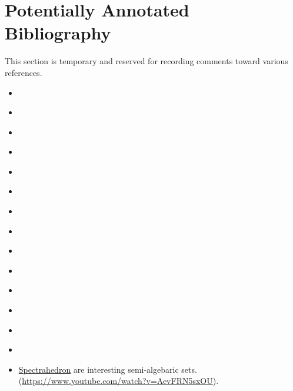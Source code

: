 \documentclass[12pt]{article}
\theoremstyle{definition}
\theoremstyle{remark}
\begin{document}
\section*{Potentially Annotated Bibliography}
This section is temporary and reserved for recording comments toward various references.
\begin{itemize}
    \item \citeauthor{vistoli2004notes}~\cite{vistoli2004notes}
    \item \citeauthor{street1974fibrations}~\cite{street1974fibrations}
    \item \citeauthor{koudenburg2018categorical}~\cite{koudenburg2018categorical}
    \item \citeauthor{brown2009algebraic}~\cite{brown2009algebraic}
    \item \citeauthor{lurie2009higher}~\cite{lurie2009higher}
    \item \citeauthor{shulman2008framed}~\cite{shulman2008framed}
    \item \citeauthor{boyd2004convex}~\cite{boyd2004convex}
    \item \citeauthor{bogart2013hom}~\cite{bogart2013hom}
    \item \citeauthor{gubeladze2016affine}~\cite{gubeladze2016affine}
    \item \citeauthor{fausk2003isomorphisms}~\cite{fausk2003isomorphisms}
    \item \citeauthor{hofstra2011dialectica}~\cite{hofstra2011dialectica}
    \item \citeauthor{ponto2012duality}~\cite{ponto2012duality}
    \item \citeauthor{mac2013categories}~\cite{mac2013categories}
    \item \citeauthor{ziegler2012lectures}~\cite{ziegler2012lectures}
    \item \href{https://en.wikipedia.org/wiki/Spectrahedron}{Spectrahedron} are interesting semi-algebaric sets. (\url{https://www.youtube.com/watch?v=AevFRN5sxOU}).
\end{itemize}

\printbibliography
\end{document}
